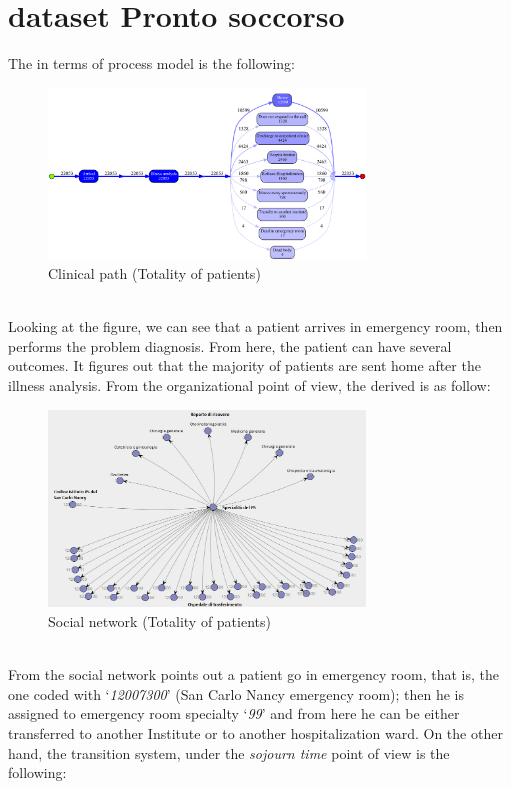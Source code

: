 \section{dataset Pronto soccorso}\label{analysis:2}
The  in terms of process model is the following:
\begin{figure} [htbp]
\includegraphics[width=0.75\textwidth, keepaspectratio]{ProntoSoccorsoInductiveVisualMiner}
\caption{Clinical path (Totality of patients)}
\end{figure}\\
Looking at the figure, we can see that a patient arrives in emergency room, then performs the problem diagnosis. From here, the patient can have several outcomes. It figures out that the majority of patients are sent home after the illness analysis. From the organizational point of view, the  derived is as follow:
\begin{figure} [htbp]
\includegraphics[width=0.75\textwidth, keepaspectratio]{ProntoSoccorsoSocialNetwork}
\caption{Social network (Totality of patients)}
\end{figure}\\
From the social network points out a patient go in emergency room, that is, the one coded with `\textit{12007300}' (San Carlo Nancy emergency room); then he is assigned to emergency room specialty `\textit{99}' and from here he can be either transferred to another Institute or to another hospitalization ward. On the other hand, the transition system, under the \textit{sojourn time} point of view is the following:
